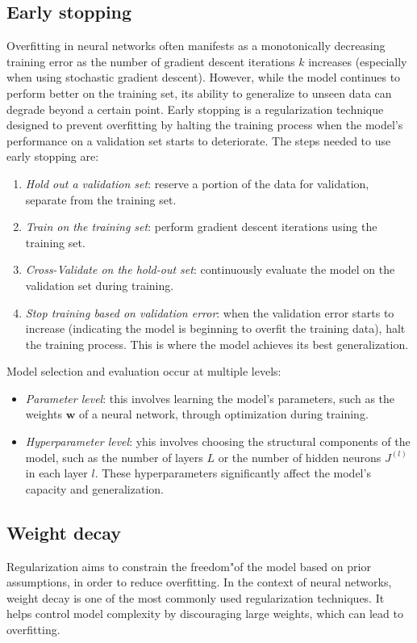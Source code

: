 \subsection{Early stopping}
Overfitting in neural networks often manifests as a monotonically decreasing training error as the number of gradient descent iterations $k$ increases (especially when using stochastic gradient descent). 
However, while the model continues to perform better on the training set, its ability to generalize to unseen data can degrade beyond a certain point. 
Early stopping is a regularization technique designed to prevent overfitting by halting the training process when the model's performance on a validation set starts to deteriorate.
The steps needed to use early stopping are: 
\begin{enumerate}
    \item \textit{Hold out a validation set}: reserve a portion of the data for validation, separate from the training set.
    \item \textit{Train on the training set}: perform gradient descent iterations using the training set.
    \item \textit{Cross-Validate on the hold-out set}: continuously evaluate the model on the validation set during training.
    \item \textit{Stop training based on validation error}: when the validation error starts to increase (indicating the model is beginning to overfit the training data), halt the training process. 
        This is where the model achieves its best generalization.
\end{enumerate}
Model selection and evaluation occur at multiple levels:
\begin{itemize}
    \item \textit{Parameter level}: this involves learning the model's parameters, such as the weights $\mathbf{w}$ of a neural network, through optimization during training.
    \item \textit{Hyperparameter level}: yhis involves choosing the structural components of the model, such as the number of layers $L$ or the number of hidden neurons $J^{(l)}$ in each layer $l$. 
        These hyperparameters significantly affect the model's capacity and generalization.
\end{itemize}

\subsection{Weight decay}
Regularization aims to constrain the freedom"of the model based on prior assumptions, in order to reduce overfitting. 
In the context of neural networks, weight decay is one of the most commonly used regularization techniques. 
It helps control model complexity by discouraging large weights, which can lead to overfitting.

